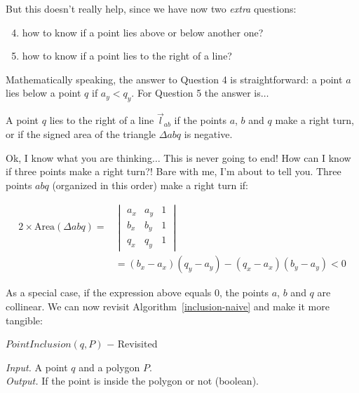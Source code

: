 \documentclass[twoside,12pt, a4paper]{memoir}
\begin{document}
But this doesn't really help, since we have now two \textit{extra} questions:

\begin{enumerate}
\setcounter{enumi}{3}
  \item how to know if a point lies above or below another one?
  \item how to know if a point lies to the right of a line?
\end{enumerate}

Mathematically speaking, the answer to Question 4 is straightforward: a point $a$ lies below a point $q$ if $a_{y} < q_{y}$. For Question 5 the answer is$\ldots$

A point $q$ lies to the right of a line $\overrightarrow{l}_{ab}$ if the points $a$, $b$ and $q$ make a right turn, or if the signed area of the triangle $\Delta abq$ is negative.

Ok, I know what you are thinking$\ldots$ This is never going to end! How can I know if three points make a right turn?! Bare with me, I'm about to tell you. Three points $abq$ (organized in this order) make a right turn if:

\begin{equation}
  \label{eq:turn}
  \begin{split}
  2 \times \text{Area} (\Delta abq) = &
      \begin{vmatrix}
        a_{x} & a_{y} & 1 \\
        b_{x} & b_{y} & 1 \\
        q_{x} & q_{y} & 1
      \end{vmatrix} \\
  & = (b_{x}-a_{x})(q_{y}-a_{y})-(q_{x}-a_{x})(b_{y}-a_{y}) < 0
  \end{split}
\end{equation}

As a special case, if the expression above equals 0, the points $a$, $b$ and $q$ are collinear. We can now revisit Algorithm~\ref{inclusion-naive} and make it more tangible:

\begin{algorithm}
\caption{$PointInclusion(q, P)$ $-$ Revisited}
\textit{Input.} A point $q$ and a polygon $P$. \\
\textit{Output.} If the point is inside the polygon or not (boolean).
\begin{algorithmic}[1]
    \EndIf{}
  \EndFor{}

  \Else{}
  \EndIf{}
\end{algorithmic}\label{inclusion-revisited}
\end{algorithm}
\end{document}

